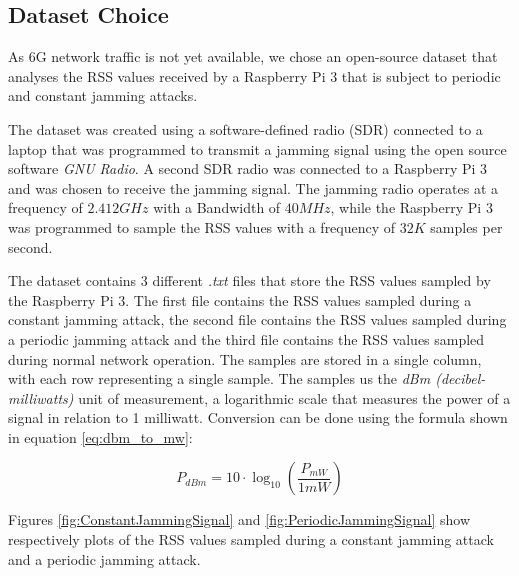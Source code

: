 \documentclass[futureinternet,article,submit,pdftex,moreauthors]{Definitions/mdpi}
\begin{document}
\subsection{Dataset Choice}\label{sec:DatasetChoice}

As 6G network traffic is not yet available, we chose an open-source dataset \cite{JammingDetectionIoT-Hussain} that analyses the RSS values 
received by a Raspberry Pi 3 that is subject to periodic and constant jamming attacks. 

The dataset was created using a software-defined radio (SDR) connected to a laptop that was programmed to transmit a jamming signal using the 
open source software \textit{GNU Radio}. A second SDR radio was connected to a Raspberry Pi 3 and was chosen to receive the jamming signal. The jamming radio operates at a frequency of $2.412 GHz$ with a Bandwidth of $40MHz$, while the Raspberry Pi 3 was programmed to sample the RSS values with a frequency of $32K$ samples per second. 

The dataset contains 3 different \textit{.txt} files that store the RSS values sampled by the Raspberry Pi 3. The first file contains the RSS values sampled during a constant jamming attack, the second file contains the RSS values sampled during a periodic jamming attack and the third file contains the RSS values sampled during normal network operation.
The samples are stored in a single column, with each row representing a single sample. The samples us the \textit{dBm (decibel-milliwatts)} unit of measurement, a logarithmic scale that measures the power of a signal in relation to 1 milliwatt. 
Conversion can be done using the formula \cite{WirelessCommSobot} shown in equation \ref{eq:dbm_to_mw}:

\begin{linenomath}
	\begin{equation}
		P_{dBm} = 10 \cdot \log_{10} \left( \frac{P_{mW}}{1mW} \right)
		\label{eq:dbm_to_mw}
	\end{equation}
\end{linenomath}

Figures \ref{fig:ConstantJammingSignal} and \ref{fig:PeriodicJammingSignal} show respectively plots of the RSS values sampled during a constant jamming attack and a periodic jamming attack. 
\end{document}
